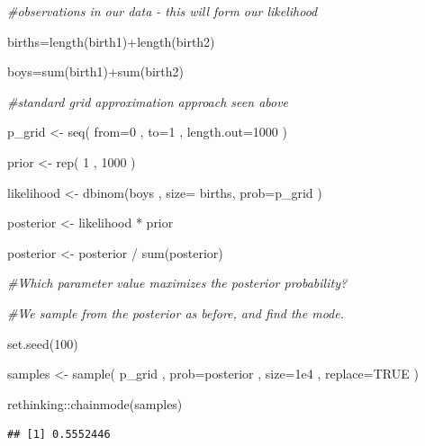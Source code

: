 \documentclass[
]{book}
\newenvironment{Shaded}{\begin{snugshade}}{\end{snugshade}}
\newcommand{\AttributeTok}[1]{\textcolor[rgb]{0.77,0.63,0.00}{#1}}
\newcommand{\CommentTok}[1]{\textcolor[rgb]{0.56,0.35,0.01}{\textit{#1}}}
\newcommand{\ConstantTok}[1]{\textcolor[rgb]{0.00,0.00,0.00}{#1}}
\newcommand{\DecValTok}[1]{\textcolor[rgb]{0.00,0.00,0.81}{#1}}
\newcommand{\FloatTok}[1]{\textcolor[rgb]{0.00,0.00,0.81}{#1}}
\newcommand{\FunctionTok}[1]{\textcolor[rgb]{0.00,0.00,0.00}{#1}}
\newcommand{\NormalTok}[1]{#1}
\newcommand{\OtherTok}[1]{\textcolor[rgb]{0.56,0.35,0.01}{#1}}
\newcommand{\SpecialCharTok}[1]{\textcolor[rgb]{0.00,0.00,0.00}{#1}}
\begin{document}
\begin{Shaded}
\begin{Highlighting}[]
\CommentTok{\#observations in our data {-} this will form our likelihood}

\NormalTok{births}\OtherTok{=}\FunctionTok{length}\NormalTok{(birth1)}\SpecialCharTok{+}\FunctionTok{length}\NormalTok{(birth2)}

\NormalTok{boys}\OtherTok{=}\FunctionTok{sum}\NormalTok{(birth1)}\SpecialCharTok{+}\FunctionTok{sum}\NormalTok{(birth2)}

\CommentTok{\#standard grid approximation approach seen above}

\NormalTok{p\_grid }\OtherTok{\textless{}{-}} \FunctionTok{seq}\NormalTok{( }\AttributeTok{from=}\DecValTok{0}\NormalTok{ , }\AttributeTok{to=}\DecValTok{1}\NormalTok{ , }\AttributeTok{length.out=}\DecValTok{1000}\NormalTok{ ) }

\NormalTok{prior }\OtherTok{\textless{}{-}} \FunctionTok{rep}\NormalTok{( }\DecValTok{1}\NormalTok{ , }\DecValTok{1000}\NormalTok{ ) }

\NormalTok{likelihood }\OtherTok{\textless{}{-}} \FunctionTok{dbinom}\NormalTok{(boys , }\AttributeTok{size=}\NormalTok{ births, }\AttributeTok{prob=}\NormalTok{p\_grid ) }
  
\NormalTok{posterior }\OtherTok{\textless{}{-}}\NormalTok{ likelihood }\SpecialCharTok{*}\NormalTok{ prior}
  
\NormalTok{posterior }\OtherTok{\textless{}{-}}\NormalTok{ posterior }\SpecialCharTok{/} \FunctionTok{sum}\NormalTok{(posterior)}


\CommentTok{\#Which parameter value maximizes the posterior probability?}

\CommentTok{\#We sample from the posterior as before, and find the mode.}
  
\FunctionTok{set.seed}\NormalTok{(}\DecValTok{100}\NormalTok{) }
  
\NormalTok{samples }\OtherTok{\textless{}{-}} \FunctionTok{sample}\NormalTok{( p\_grid , }\AttributeTok{prob=}\NormalTok{posterior , }\AttributeTok{size=}\FloatTok{1e4}\NormalTok{ , }\AttributeTok{replace=}\ConstantTok{TRUE}\NormalTok{ )}

\NormalTok{rethinking}\SpecialCharTok{::}\FunctionTok{chainmode}\NormalTok{(samples)}
\end{Highlighting}
\end{Shaded}

\begin{verbatim}
## [1] 0.5552446
\end{verbatim}
\end{document}
